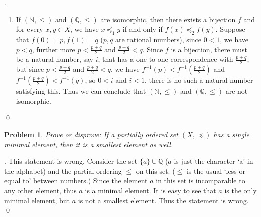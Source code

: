 \documentclass[12pt]{article}
\newtheorem{hw}{Problem}
\newenvironment{sol}
  {\par\vspace{3mm}\noindent{\it Solution}.}
  {\qed}
\begin{document}
\begin{sol}
\begin{enumerate}
		\item If $(\mathbb{N},\leq)$ and $(\mathbb{Q},\leq)$ are isomorphic, then there exists a bijection $f$ and for every $x,y\in X$, we have $x\preceq_1 y$ if and only if $f(x)\preceq_2 f(y)$. Suppose that $f(0) = p, f(1) = q$ ($p, q$ are rational numbers), since $0 < 1$, we have $p < q$, further more $p < \frac{p + q}{2}$ and $\frac{p + q}{2} < q$. Since $f$ is a bijection, there must be a natural number, say $i$, that has a one-to-one correspondence with $\frac{p + q}{2}$, but since $p < \frac{p + q}{2}$ and $\frac{p + q}{2} < q$, we have $f^{-1}(p) < f^{-1}(\frac{p + q}{2})$ and $f^{-1}(\frac{p + q}{2}) < f^{-1}(q)$, so $0 < i$ and $i < 1$, there is no such a natural number satisfying this. Thus we can conclude that $(\mathbb{N},\leq)$ and $(\mathbb{Q},\leq)$ are not isomorphic.
	\end{enumerate}
\end{sol}

\begin{hw}
Prove or disprove: If a partially ordered set $(X,\preceq)$ has a single minimal element, then it is a smallest element as well.
\end{hw}
\begin{sol}
	This statement is wrong. Consider the set $\{a\} \cup \mathbb{Q}$ ($a$ is just the character `a' in the alphabet) and the partial ordering $\leq$ on this set. ($\leq$ is the usual `less or equal to' between numbers.) Since the element $a$ in this set is incomparable to any other element, thus $a$ is a minimal element. It is easy to see that $a$ is the only minimal element, but $a$ is not a smallest element. Thus the statement is wrong.
\end{sol}
\end{document}
